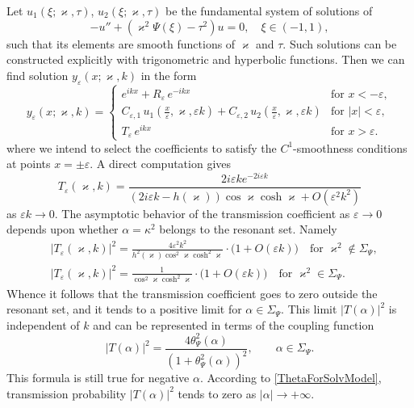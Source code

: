 \documentclass[11pt,english]{amsart}%
\DeclareMathOperator*{\csh}{cosh} \DeclareMathOperator*{\snh}{sinh}
\begin{document}
Let $u_1(\xi;\varkappa,\tau)$, $u_2(\xi;\varkappa,\tau)$ be the fundamental system of solutions of
$$
-u''+(\varkappa^2\Psi(\xi)-\tau^2)u= 0, \quad \xi\in(-1,1),
$$
such that its elements are smooth functions of $\varkappa$ and $\tau$.
Such solutions can be constructed explicitly with trigonometric and  hyperbolic functions.
Then we can find  solution  $y_\varepsilon(x;\varkappa,k)$ in the form
\begin{equation*}
y_\varepsilon(x;\varkappa,k)=
\begin{cases}
e^{ikx}+R_\varepsilon\,e^{-ikx}& \text{for } x<-\varepsilon,\\
C_{\varepsilon,1}\,u_1(\frac{x}{\varepsilon},\varkappa, \varepsilon k)+C_{\varepsilon,2}\,u_2(\frac{x}{\varepsilon},\varkappa, \varepsilon k) & \text{for } |x|<\varepsilon,\\
T_\varepsilon\,e^{ikx} & \text{for } x>\varepsilon.
\end{cases}
\end{equation*}
where we intend to select the coefficients to satisfy  the $C^1$-smoothness conditions at points $x=\pm \varepsilon$.
A direct computation gives
\begin{equation}\label{Teps}
  T_\varepsilon(\varkappa,k)= \frac{2i\varepsilon k e^{-2i\varepsilon k}}{(2i\varepsilon k-h(\varkappa))\cos\varkappa \csh\varkappa+O(\varepsilon^2k^2)}
\end{equation}
as $\varepsilon k\to 0$. The asymptotic behavior of the transmission coefficient as $\varepsilon\to 0$ depends upon whether $\alpha=\kappa^2$ belongs to the resonant set. Namely
\begin{align}\label{TepsAsymptotics}
  &|T_\varepsilon(\varkappa,k)|^2= \frac{4\varepsilon^2 k^2}{h^2(\varkappa)\cos^2\varkappa \csh^2\varkappa}\cdot
  \bigl(1+O\left(\varepsilon k\right)\bigr)\quad\text{for }
  \varkappa^2\not\in \Sigma_\Psi,\\\label{TepsAsymptoticsR}
  &|T_\varepsilon(\varkappa,k)|^2= \frac{1}{\cos^2\varkappa \csh^2\varkappa}\cdot\bigl(1+O(\varepsilon k)\bigr)\quad\text{for }
  \varkappa^2\in \Sigma_\Psi.
\end{align}
Whence it follows that the transmission coefficient goes to zero outside  the resonant set, and
it tends to a positive limit for $\alpha\in \Sigma_{\Psi}$. This limit $|T(\alpha)|^2$ is independent of $k$
and can be represented  in terms of the coupling function
\begin{equation*}
  |T(\alpha)|^2=\frac{4\theta_\Psi^2(\alpha)}{(1+\theta_\Psi^2(\alpha))^2}, \qquad \alpha\in \Sigma_\Psi.
\end{equation*}
This formula is still true  for negative $\alpha$. According to \eqref{ThetaForSolvModel},  transmission probability $|T(\alpha)|^2$ tends to zero as $|\alpha|\to +\infty$.
\end{document}

